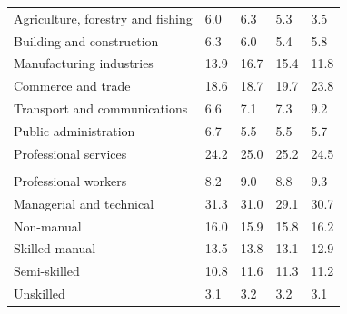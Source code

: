 \documentclass{article}
\begin{document}
\begin{table}[h]
\begin{tabular}{KTTTT}
    \hline
Agriculture, forestry and fishing  & 6.0& 6.3& 5.3& 3.5\\
Building and construction & 6.3& 6.0& 5.4& 5.8\\
Manufacturing industries & 13.9& 16.7& 15.4& 11.8\\
Commerce and trade  & 18.6& 18.7& 19.7& 23.8\\
Transport and communications  & 6.6& 7.1& 7.3& 9.2\\
Public administration & 6.7& 5.5& 5.5& 5.7\\
Professional services & 24.2& 25.0& 25.2& 24.5\\
\hline
    \\ 
    \hline
Professional workers  & 8.2& 9.0 & 8.8& 9.3\\
Managerial and technical & 31.3& 31.0& 29.1& 30.7\\
Non-manual & 16.0& 15.9& 15.8& 16.2\\
Skilled manual & 13.5& 13.8& 13.1& 12.9\\
Semi-skilled & 10.8& 11.6& 11.3& 11.2\\
Unskilled  & 3.1& 3.2& 3.2& 3.1\\
\end{tabular}
\end{table}
\pagebreak
\end{document}
